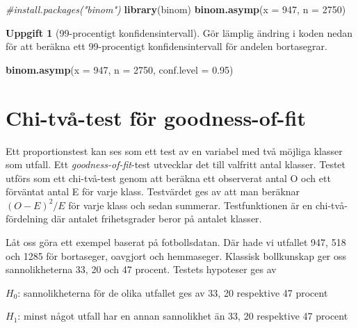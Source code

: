 \documentclass[
]{book}
\newenvironment{Shaded}{\begin{snugshade}}{\end{snugshade}}
\newcommand{\AttributeTok}[1]{\textcolor[rgb]{0.13,0.29,0.53}{#1}}
\newcommand{\CommentTok}[1]{\textcolor[rgb]{0.56,0.35,0.01}{\textit{#1}}}
\newcommand{\DecValTok}[1]{\textcolor[rgb]{0.00,0.00,0.81}{#1}}
\newcommand{\FloatTok}[1]{\textcolor[rgb]{0.00,0.00,0.81}{#1}}
\newcommand{\FunctionTok}[1]{\textcolor[rgb]{0.13,0.29,0.53}{\textbf{#1}}}
\newcommand{\NormalTok}[1]{#1}
\theoremstyle{definition}
\theoremstyle{definition}
\theoremstyle{definition}
\newtheorem{exercise}{Uppgift}[chapter]
\theoremstyle{definition}
\theoremstyle{remark}
\begin{document}
\begin{Shaded}
\begin{Highlighting}[]
\CommentTok{\#install.packages("binom")}
\FunctionTok{library}\NormalTok{(binom)}
\FunctionTok{binom.asymp}\NormalTok{(}\AttributeTok{x =} \DecValTok{947}\NormalTok{, }\AttributeTok{n =} \DecValTok{2750}\NormalTok{)}
\end{Highlighting}
\end{Shaded}

\begin{exercise}[99-procentigt konfidensintervall]

Gör lämplig ändring i koden nedan för att beräkna ett 99-procentigt konfidensintervall för andelen bortasegrar.

\begin{Shaded}
\begin{Highlighting}[]
\FunctionTok{binom.asymp}\NormalTok{(}\AttributeTok{x =} \DecValTok{947}\NormalTok{, }\AttributeTok{n =} \DecValTok{2750}\NormalTok{, }\AttributeTok{conf.level =} \FloatTok{0.95}\NormalTok{)}
\end{Highlighting}
\end{Shaded}

\end{exercise}

\section{Chi-två-test för goodness-of-fit}\label{chi-tvuxe5-test-fuxf6r-goodness-of-fit}

Ett proportionstest kan ses som ett test av en variabel med två möjliga klasser som utfall. Ett \emph{goodness-of-fit}-test utvecklar det till valfritt antal klasser. Testet utförs som ett chi-två-test genom att beräkna ett observerat antal O och ett förväntat antal E för varje klass. Testvärdet ges av att man beräknar \((O - E)^2 / E\) för varje klass och sedan summerar. Testfunktionen är en chi-två-fördelning där antalet frihetsgrader beror på antalet klasser.

Låt oss göra ett exempel baserat på fotbollsdatan. Där hade vi utfallet 947, 518 och 1285 för bortaseger, oavgjort och hemmaseger. Klassisk bollkunskap ger oss sannolikheterna 33, 20 och 47 procent. Testets hypoteser ges av

\(H_0\): sannolikheterna för de olika utfallet ges av 33, 20 respektive 47 procent

\(H_1\): minst något utfall har en annan sannolikhet än 33, 20 respektive 47 procent
\end{document}
